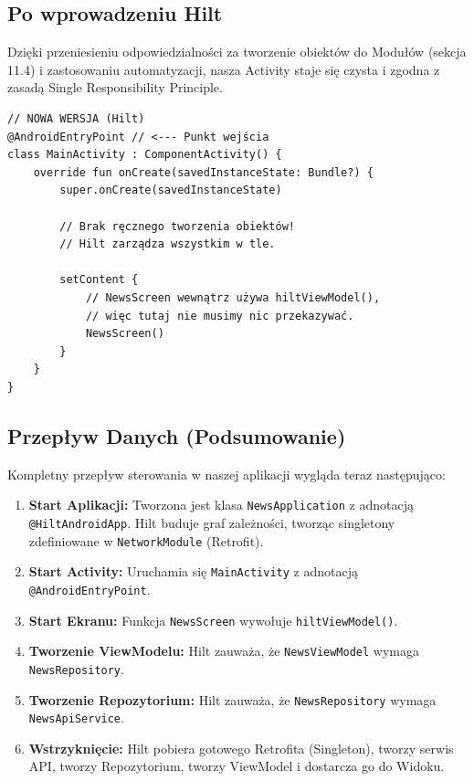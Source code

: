 \subsection{Po wprowadzeniu Hilt}

Dzięki przeniesieniu odpowiedzialności za tworzenie obiektów do Modułów (sekcja 11.4) i zastosowaniu automatyzacji, nasza Activity staje się czysta i zgodna z zasadą Single Responsibility Principle.

\begin{verbatim}
// NOWA WERSJA (Hilt)
@AndroidEntryPoint // <--- Punkt wejścia
class MainActivity : ComponentActivity() {
    override fun onCreate(savedInstanceState: Bundle?) {
        super.onCreate(savedInstanceState)
        
        // Brak ręcznego tworzenia obiektów!
        // Hilt zarządza wszystkim w tle.

        setContent {
            // NewsScreen wewnątrz używa hiltViewModel(), 
            // więc tutaj nie musimy nic przekazywać.
            NewsScreen() 
        }
    }
}
\end{verbatim}

\subsection{Przepływ Danych (Podsumowanie)}

Kompletny przepływ sterowania w naszej aplikacji wygląda teraz następująco:

\begin{enumerate}
    \item \textbf{Start Aplikacji:} Tworzona jest klasa \texttt{NewsApplication} z adnotacją \texttt{@HiltAndroidApp}. Hilt buduje graf zależności, tworząc singletony zdefiniowane w \texttt{NetworkModule} (Retrofit).
    \item \textbf{Start Activity:} Uruchamia się \texttt{MainActivity} z adnotacją \texttt{@AndroidEntryPoint}.
    \item \textbf{Start Ekranu:} Funkcja \texttt{NewsScreen} wywołuje \texttt{hiltViewModel()}.
    \item \textbf{Tworzenie ViewModelu:} Hilt zauważa, że \texttt{NewsViewModel} wymaga \texttt{NewsRepository}.
    \item \textbf{Tworzenie Repozytorium:} Hilt zauważa, że \texttt{NewsRepository} wymaga \texttt{NewsApiService}.
    \item \textbf{Wstrzyknięcie:} Hilt pobiera gotowego Retrofita (Singleton), tworzy serwis API, tworzy Repozytorium, tworzy ViewModel i dostarcza go do Widoku.
\end{enumerate}


